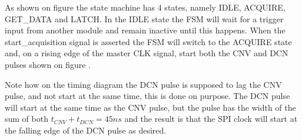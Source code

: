 As shown on figure  the state machine has 4 states, namely IDLE, ACQUIRE, GET\_DATA and LATCH. In the IDLE state the FSM will wait for a trigger input from another module and remain inactive until this happens. When the start\_acquisition signal is asserted the FSM will switch to the ACQUIRE state and, on a rising edge of the master CLK signal, start both the CNV and DCN pulses shown on figure .

Note how on the timing diagram the DCN pulse is supposed to lag the CNV pulse, and not start at the same time, this is done on purpose. The DCN pulse will start at the same time as the CNV pulse, but the pulse has the width of the sum of both $t_{CNV} + t_{DCN} = 45 ns$ and the result is that the SPI clock will start at the falling edge of the DCN pulse as desired.  





